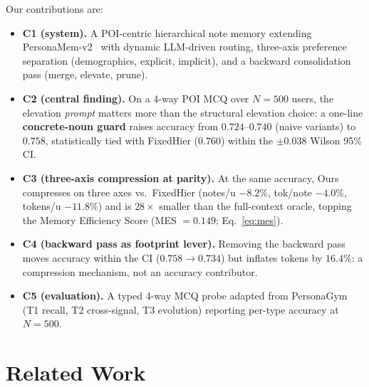 \documentclass[sigconf,review,anonymous]{acmart}
\begin{document}
Our contributions are:
\begin{itemize}
    \item \textbf{C1 (system).} A POI-centric hierarchical note memory extending PersonaMem-v2~\cite{personamem-v2} with dynamic LLM-driven routing, three-axis preference separation (demographics, explicit, implicit), and a backward consolidation pass (merge, elevate, prune).
    \item \textbf{C2 (central finding).} On a 4-way POI MCQ over \(N{=}500\) users, the elevation \emph{prompt} matters more than the structural elevation choice: a one-line \textbf{concrete-noun guard} raises accuracy from \(0.724\)--\(0.740\) (naive variants) to \(0.758\), statistically tied with FixedHier (\(0.760\)) within the \(\pm 0.038\) Wilson 95\% CI.
    \item \textbf{C3 (three-axis compression at parity).} At the same accuracy, Ours compresses on three axes vs.\ FixedHier (notes/u \(-8.2\%\), tok/note \(-4.0\%\), tokens/u \(-11.8\%\)) and is \(28\times\) smaller than the full-context oracle, topping the Memory Efficiency Score (MES \(=0.149\); Eq.~\ref{eq:mes}).
    \item \textbf{C4 (backward pass as footprint lever).} Removing the backward pass moves accuracy within the CI (\(0.758\!\to\!0.734\)) but inflates tokens by \(16.4\%\): a compression mechanism, not an accuracy contributor.
    \item \textbf{C5 (evaluation).} A typed 4-way MCQ probe adapted from PersonaGym~\cite{personagym} (T1 recall, T2 cross-signal, T3 evolution) reporting per-type accuracy at \(N{=}500\).
\end{itemize}


\section{Related Work}
\end{document}
